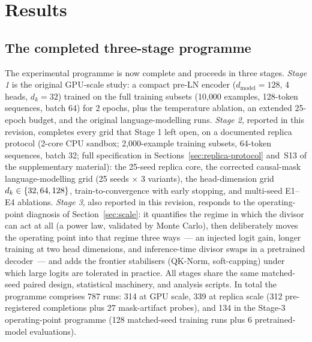 \section{Results}\label{sec:results}

\subsection{The completed three-stage programme}\label{sec:manifest}
The experimental programme is now complete and proceeds in three stages.
\emph{Stage 1} is the original GPU-scale study: a compact pre-LN encoder
($d_{\text{model}}=128$, 4 heads, $d_k=32$) trained on the full training
subsets (10{,}000 examples, 128-token sequences, batch 64) for 2 epochs, plus
the temperature ablation, an extended 25-epoch budget, and the original
language-modelling runs. \emph{Stage 2}, reported in this revision, completes
every grid that Stage 1 left open, on a documented replica protocol (2-core CPU
sandbox; 2{,}000-example training subsets, 64-token sequences, batch 32; full
specification in Sections~\ref{sec:replica-protocol}
and~S13 of the supplementary material): the 25-seed replica core, the corrected causal-mask
language-modelling grid (25 seeds $\times$ 3 variants), the head-dimension grid
$d_k \in \{32, 64, 128\}$, train-to-convergence with early stopping, and
multi-seed E1--E4 ablations. \emph{Stage 3}, also reported in this revision,
responds to the operating-point diagnosis of Section~\ref{sec:scale}: it
quantifies the regime in which the divisor can act at all (a power law,
validated by Monte Carlo), then deliberately moves the operating point into
that regime three ways~--- an injected logit gain, longer training at two head
dimensions, and inference-time divisor swaps in a pretrained decoder~--- and
adds the frontier stabilisers (QK-Norm, soft-capping) under which large logits
are tolerated in practice. All stages share the same matched-seed paired
design, statistical machinery, and analysis scripts.
In total the programme comprises 787 runs: 314 at GPU scale, 339 at replica
scale (312 pre-registered completions plus 27 mask-artifact probes), and 134
in the Stage-3 operating-point programme (128 matched-seed training runs plus
6 pretrained-model evaluations).

